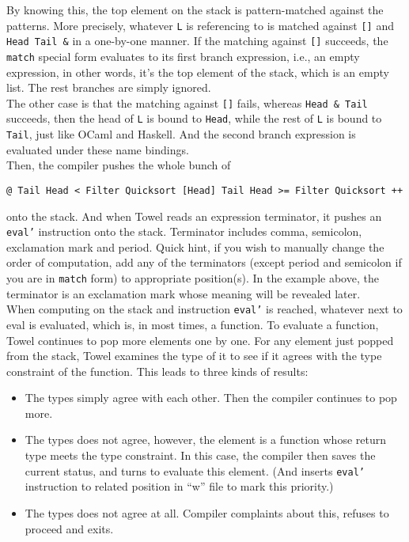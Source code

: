 \documentclass{article}
\begin{document}
By knowing this, the top element on the stack is pattern-matched against the patterns. More precisely, whatever \texttt{L} is referencing to is matched against \texttt{[]} and \texttt{Head Tail \&} in a one-by-one manner. If the matching against \texttt{[]} succeeds, the \texttt{match} special form evaluates to its first branch expression, i.e., an empty expression, in other words, it's the top element of the stack, which is an empty list. The rest branches are simply ignored.\\

The other case is that the matching against \texttt{[]} fails, whereas \texttt{Head \& Tail} succeeds, then the head of \texttt{L} is bound to \texttt{Head}, while the rest of \texttt{L} is bound to \texttt{Tail}, just like OCaml and Haskell. And the second branch expression is evaluated under these name bindings.\\

Then, the compiler pushes the whole bunch of \newline

\texttt{@ Tail Head < Filter Quicksort [Head] Tail Head >= Filter Quicksort ++}\newline

onto the stack. And when Towel reads an expression terminator, it pushes an \texttt{eval'} instruction onto the stack. Terminator includes comma, semicolon, exclamation mark and period. Quick hint, if you wish to manually change the order of computation, add any of the terminators (except period and semicolon if you are in \texttt{match} form) to appropriate position(s). In the example above, the terminator is an exclamation mark whose meaning will be revealed later.\\

When computing on the stack and instruction \texttt{eval'} is reached, whatever next to eval is evaluated, which is, in most times, a function. To evaluate a function, Towel continues to pop more elements one by one. For any element just popped from the stack, Towel examines the type of it to see if it agrees with the type constraint of the function. This leads to three kinds of results:

\begin{itemize}
\item The types simply agree with each other. Then the compiler continues to pop more.
\item The types does not agree, however, the element is a function whose return type meets the type constraint. In this case, the compiler then saves the current status, and turns to evaluate this element. (And inserts \texttt{eval'} instruction to related position in ``w'' file to mark this priority.)
\item The types does not agree at all. Compiler complaints about this, refuses to proceed and exits.
\end{itemize}
\end{document}
